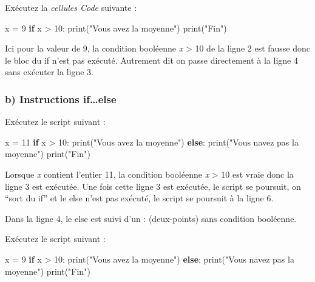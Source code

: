\documentclass[
  paper=a4,
  ,captions=tableheading
]{scrartcl}
\newenvironment{Shaded}{}{}
\newcommand{\BuiltInTok}[1]{\textcolor[rgb]{0.00,0.50,0.00}{#1}}
\newcommand{\ControlFlowTok}[1]{\textcolor[rgb]{0.00,0.44,0.13}{\textbf{#1}}}
\newcommand{\DecValTok}[1]{\textcolor[rgb]{0.25,0.63,0.44}{#1}}
\newcommand{\NormalTok}[1]{#1}
\newcommand{\OperatorTok}[1]{\textcolor[rgb]{0.40,0.40,0.40}{#1}}
\newcommand{\StringTok}[1]{\textcolor[rgb]{0.25,0.44,0.63}{#1}}
\begin{document}
Exécutez la \emph{cellules Code} suivante :

\begin{Shaded}
\begin{Highlighting}[]
\NormalTok{x }\OperatorTok{=} \DecValTok{9}
\ControlFlowTok{if}\NormalTok{ x }\OperatorTok{\textgreater{}} \DecValTok{10}\NormalTok{:}
    \BuiltInTok{print}\NormalTok{(}\StringTok{"Vous avez la moyenne"}\NormalTok{)}
\BuiltInTok{print}\NormalTok{(}\StringTok{"Fin"}\NormalTok{)}
\end{Highlighting}
\end{Shaded}

Ici pour la valeur de 9, la condition booléenne
\emph{x} \textgreater{} 10 de la ligne 2 est fausse donc le bloc du if
n'est pas exécuté. Autrement dit on passe directement à la ligne 4 sans
exécuter la ligne 3.

\hypertarget{b-instructions-ifelse}{%
\subsubsection{b) Instructions
if\ldots else}\label{b-instructions-ifelse}}

Exécutez le script suivant :

\begin{Shaded}
\begin{Highlighting}[]
\NormalTok{x }\OperatorTok{=} \DecValTok{11}
\ControlFlowTok{if}\NormalTok{ x }\OperatorTok{\textgreater{}} \DecValTok{10}\NormalTok{:}
    \BuiltInTok{print}\NormalTok{(}\StringTok{"Vous avez la moyenne"}\NormalTok{)}
\ControlFlowTok{else}\NormalTok{:}
    \BuiltInTok{print}\NormalTok{(}\StringTok{"Vous n\textquotesingle{}avez pas la moyenne"}\NormalTok{)}
\BuiltInTok{print}\NormalTok{(}\StringTok{"Fin"}\NormalTok{)}
\end{Highlighting}
\end{Shaded}

Lorsque \emph{x} contient l'entier 11, la condition booléenne
\emph{x} \textgreater{} 10 est vraie donc la ligne 3 est exécutée. Une
fois cette ligne 3 est exécutée, le script se poursuit, on ``sort du
if'' et le else n'est pas exécuté, le script se poursuit à la ligne 6.

Dans la ligne 4, le else est suivi d'un : (deux-points) sans condition
booléenne.

Exécutez le script suivant :

\begin{Shaded}
\begin{Highlighting}[]
\NormalTok{x }\OperatorTok{=} \DecValTok{9}
\ControlFlowTok{if}\NormalTok{ x }\OperatorTok{\textgreater{}} \DecValTok{10}\NormalTok{:}
    \BuiltInTok{print}\NormalTok{(}\StringTok{"Vous avez la moyenne"}\NormalTok{)}
\ControlFlowTok{else}\NormalTok{:}
    \BuiltInTok{print}\NormalTok{(}\StringTok{"Vous n\textquotesingle{}avez pas la moyenne"}\NormalTok{)}
\BuiltInTok{print}\NormalTok{(}\StringTok{"Fin"}\NormalTok{)}
\end{Highlighting}
\end{Shaded}
\end{document}
